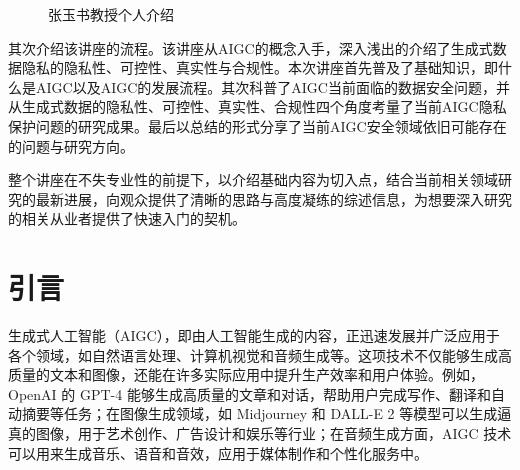 \documentclass[a4paper]{nuist}
\begin{document}
\begin{figure}[htbp]
{    }
    \caption {张玉书教授个人介绍}
\end{figure}

其次介绍该讲座的流程。该讲座从AIGC的概念入手，深入浅出的介绍了生成式数据隐私的隐私性、可控性、真实性与合规性。本次讲座首先普及了基础知识，即什么是AIGC以及AIGC的发展流程。其次科普了AIGC当前面临的数据安全问题，并从生成式数据的隐私性、可控性、真实性、合规性四个角度考量了当前AIGC隐私保护问题的研究成果。最后以总结的形式分享了当前AIGC安全领域依旧可能存在的问题与研究方向。

整个讲座在不失专业性的前提下，以介绍基础内容为切入点，结合当前相关领域研究的最新进展，向观众提供了清晰的思路与高度凝练的综述信息，为想要深入研究的相关从业者提供了快速入门的契机。

\section{引言}

生成式人工智能（AIGC），即由人工智能生成的内容，正迅速发展并广泛应用于各个领域，如自然语言处理、计算机视觉和音频生成等。这项技术不仅能够生成高质量的文本和图像，还能在许多实际应用中提升生产效率和用户体验。例如，OpenAI\cite{OpenAI66:online} 的 GPT-4 能够生成高质量的文章和对话，帮助用户完成写作、翻译和自动摘要等任务；在图像生成领域，如 Midjourney\cite{Midjourn42:online} 和 DALL-E 2\cite{DALLE2O26:online} 等模型可以生成逼真的图像，用于艺术创作、广告设计和娱乐等行业；在音频生成方面，AIGC 技术可以用来生成音乐、语音和音效，应用于媒体制作和个性化服务中。
\end{document}
